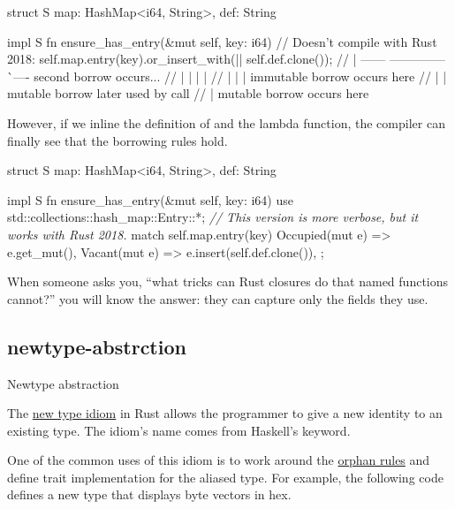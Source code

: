\documentclass{article}
\begin{document}
\begin{code}[bad]
struct S { map: HashMap<i64, String>, def: String }

impl S {
  fn ensure_has_entry(&mut self, key: i64) {
    // Doesn't compile with Rust 2018:
    self.map.entry(key).or_insert_with(|| self.def.clone());
// |         ------            -------------- ^^ ---- second borrow occurs...
// |         |                 |              |
// |         |                 |              immutable borrow occurs here
// |         |                 mutable borrow later used by call
// |         mutable borrow occurs here
  }
}
\end{code}

However, if we inline the definition of  and the lambda function, the compiler can finally see that the borrowing rules hold.

\begin{code}[good]
struct S { map: HashMap<i64, String>, def: String }

impl S {
  fn ensure_has_entry(&mut self, key: i64) {
    use std::collections::hash_map::Entry::*;
    \emph{// This version is more verbose, but it works with Rust 2018.}
    match self.map.entry(key) {
      Occupied(mut e) => e.get_mut(),
      Vacant(mut e) => e.insert(self.def.clone()),
    };
  }
}
\end{code}

When someone asks you, ``what tricks can Rust closures do that named functions cannot?'' you will know the answer: they can capture only the fields they use.

\subsection{newtype-abstrction}{Newtype abstraction}

The \href{https://doc.rust-lang.org/rust-by-example/generics/new_types.html}{new type idiom} in Rust allows the programmer to give a new identity to an existing type.
The idiom's name comes from Haskell's \href{https://wiki.haskell.org/Newtype}{} keyword.

One of the common uses of this idiom is to work around the \href{#orphan-rules}{orphan rules} and define trait implementation for the aliased type.
For example, the following code defines a new type that displays byte vectors in hex.
\end{document}
